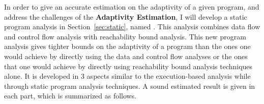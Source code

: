 \begin{enumerate}
In order to give an accurate estimation on the adaptivity of a given program, and address
the challenges of the \textbf{Adaptivity Estimation},
I will develop a static program analysis in Section~\ref{sec:static}, named {\THESYSTEM}.
This analysis combines data flow and control flow analysis with reachability bound analysis.
This new program analysis gives tighter bounds on the adaptivity of a program than the ones one would achieve 
by directly using the data and control flow analyses or the ones that one would achieve 
by directly using reachability bound analysis techniques alone. 
It is developed in 3 aspects similar to the execution-based analysis 
while through static program analysis techniques.
A sound estimated result is given in each part, which is summarized as follows.

\end{enumerate}
